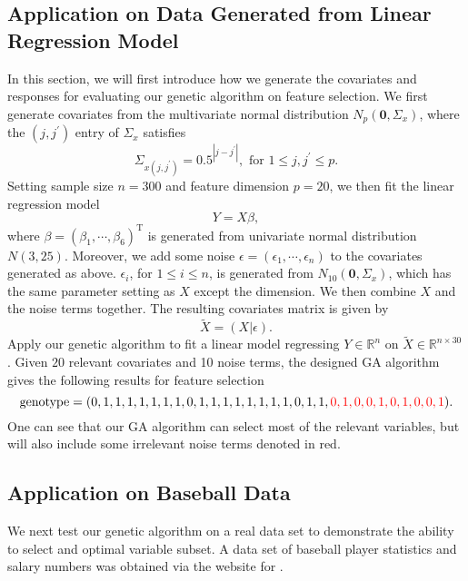 \documentclass{article}
\begin{document}
\subsection{Application on Data Generated from Linear Regression Model}
In this section, we will first introduce how we generate the covariates and responses for evaluating our genetic algorithm on feature selection. We first generate covariates from the multivariate normal distribution $N_{p}(\bm{0}, \Sigma_{x})$, where the $(j, j^{\prime})$ entry of $\Sigma_{x}$ satisfies
$$
\Sigma_{x(j,j^{\prime})} = 0.5^{|j-j^{\prime}|}, \mbox{ for } 1\leq j, j^{\prime}\leq p.
$$
Setting sample size $n=300$ and feature dimension $p=20$, we then fit the linear regression model
$$
Y = X\beta,
$$
where $\beta=(\beta_{1}, \cdots, \beta_{6})^{\mathrm{T}}$ is generated from univariate normal distribution $N(3, 25)$. Moreover, we add some noise $\epsilon=(\epsilon_{1}, \cdots, \epsilon_{n})$ to the covariates generated as above. $\epsilon_{i}$, for $1\leq i \leq n$, is generated from $N_{10}(\bm{0}, \Sigma_{x})$, which has the same parameter setting as $X$ except the dimension. We then combine $X$ and the noise terms together. The resulting covariates matrix is given by
$$
\tilde{X} = (X|\epsilon).
$$
Apply our genetic algorithm to fit a linear model regressing $Y\in \mathbb{R}^{n}$ on $\tilde{X}\in \mathbb{R}^{n\times 30}$. Given $20$ relevant covariates and 10 noise terms, the designed GA algorithm gives the following results for feature selection
$$
\mbox{genotype}=(0, 1, 1, 1, 1, 1, 1, 1, 0, 1, 1, 1, 1, 1, 1, 1, 1, 0, 1, 1, \textcolor{red}{0, 1, 0, 0, 1, 0, 1, 0, 0, 1}).
$$
One can see that our GA algorithm can select most of the relevant variables, but will also include some irrelevant noise terms denoted in red.


\subsection{Application on Baseball Data}
We next test our genetic algorithm on a real data set to demonstrate the ability to select and optimal variable subset.  A data set of baseball player statistics and salary numbers was obtained via the website for \citet{compute}.
\end{document}
